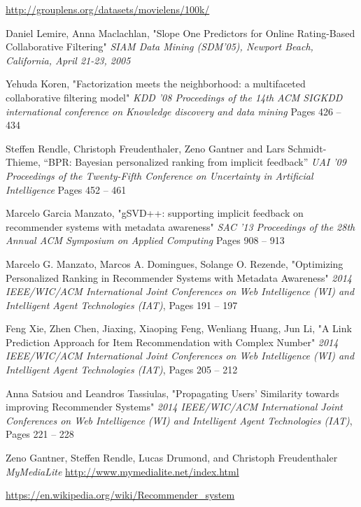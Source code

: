 \documentclass{pracamgr}
\begin{document}
\begin{thebibliography}{99}

   \url{http://grouplens.org/datasets/movielens/100k/}
  
   Daniel Lemire, Anna Maclachlan,
  "Slope One Predictors for Online Rating-Based Collaborative Filtering"
  \textit{SIAM Data Mining (SDM'05), Newport Beach, California, April 21-23, 2005}  
  
   Yehuda Koren,
  "Factorization meets the neighborhood: a multifaceted collaborative filtering model"
  \textit{KDD '08 Proceedings of the 14th ACM SIGKDD international conference on Knowledge discovery and data mining}
  Pages 426 -- 434 
  
   Steffen Rendle, Christoph Freudenthaler, Zeno Gantner and Lars Schmidt-Thieme,
  “BPR: Bayesian personalized ranking from implicit feedback”
  \textit{UAI '09 Proceedings of the Twenty-Fifth Conference on Uncertainty in Artificial Intelligence}
  Pages 452 -- 461
  
   Marcelo Garcia Manzato,
  "gSVD++: supporting implicit feedback on recommender systems with metadata awareness"
  \textit{SAC '13 Proceedings of the 28th Annual ACM Symposium on Applied Computing}
  Pages 908 -- 913

   Marcelo G. Manzato, Marcos A. Domingues, Solange O. Rezende,
  "Optimizing Personalized Ranking in Recommender Systems with Metadata Awareness"
  \textit{2014 IEEE/WIC/ACM International Joint Conferences on Web Intelligence (WI) and Intelligent Agent Technologies (IAT)},
  Pages 191 -- 197
  
   Feng Xie, Zhen Chen, Jiaxing, Xiaoping Feng, Wenliang Huang, Jun Li,
  "A Link Prediction Approach for Item Recommendation with Complex Number"
  \textit{2014 IEEE/WIC/ACM International Joint Conferences on Web Intelligence (WI) and Intelligent Agent Technologies (IAT)},
  Pages 205 -- 212

   Anna Satsiou and Leandros Tassiulas,
  "Propagating Users’ Similarity towards improving Recommender Systems"
  \textit{2014 IEEE/WIC/ACM International Joint Conferences on Web Intelligence (WI) and Intelligent Agent Technologies (IAT)},
  Pages 221 -- 228

   Zeno Gantner, Steffen Rendle, Lucas Drumond, and Christoph Freudenthaler
  \textit{MyMediaLite}
  \url{http://www.mymedialite.net/index.html}
  
   \url{https://en.wikipedia.org/wiki/Recommender_system}

\end{thebibliography}
\end{document}
